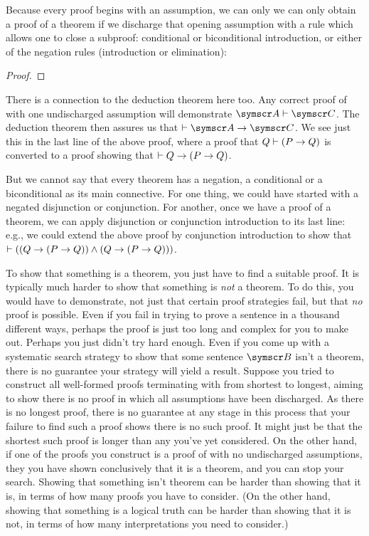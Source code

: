 Because every proof begins with an assumption, we can only we can only obtain a proof of a theorem if we discharge that opening assumption with a rule which allows one to close a subproof: conditional or biconditional introduction, or either of the negation rules (introduction or elimination): 
  \begin{proof}
    \open
    \open
    \open
    \close
    \close
    \close
  \end{proof}
There is a connection to the deduction theorem here too. Any correct proof of  with one undischarged assumption  will demonstrate $\meta{A}\proves\meta{C}$. The deduction theorem then assures us that $\proves \meta{A}\eif\meta{C}$. We see just this in the last line of the above proof, where a proof that $Q \vdash (P \rightarrow Q)$ is converted to a proof showing that $\vdash Q \rightarrow (P \rightarrow Q)$.

But we cannot say that every theorem has a negation, a conditional or a biconditional as its main connective. For one thing, we could have started with a negated disjunction or conjunction. For another, once we have a proof of a theorem, we can apply disjunction or conjunction introduction to its last line: e.g., we could extend the above proof by conjunction introduction to show that $\vdash ((Q \to (P \to Q))\wedge (Q \to (P \to Q)))$. 



To show that something is a theorem, you just have to find a suitable proof. It is typically much harder to show that something is \emph{not} a theorem. To do this, you would have to demonstrate, not just that certain proof strategies fail, but that \emph{no} proof is possible. Even if you fail in trying to prove a sentence in a thousand different ways, perhaps the proof is just too long and complex for you to make out. Perhaps you just didn't try hard enough. Even if you come up with a systematic search strategy to show that some sentence $\meta{B}$ isn't a theorem, there is no guarantee your strategy will yield a result. Suppose you tried to construct all well-formed proofs terminating with  from shortest to longest, aiming to show there is no proof in which all assumptions have been discharged. As there is no longest proof, there is no guarantee at any stage in this process that your failure to find such a proof shows there is no such proof. It might just be that the shortest such proof is longer than any you've yet considered. On the other hand, if one of the proofs you construct is a proof of  with no undischarged assumptions, they you have shown conclusively that it is a theorem, and you can stop your search. Showing that something isn't theorem can be harder than showing that it is, in terms of how many proofs you have to consider. (On the other hand, showing that something is a logical truth can be harder than showing that it is not, in terms of how many interpretations you need to consider.)



